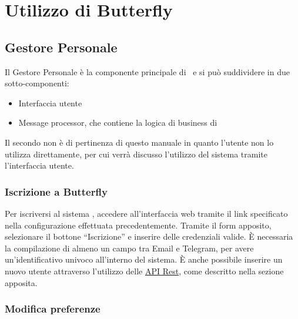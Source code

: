 \section{Utilizzo di Butterfly}\label{utilizzo}


\subsection{Gestore Personale}

Il Gestore Personale è la componente principale di \progetto\ e si può suddividere in due sotto-componenti:

\begin{itemize}
    \item Interfaccia utente
    \item Message processor, che contiene la logica di business di \progetto
\end{itemize}

Il secondo non è di pertinenza di questo manuale in quanto l'utente non lo utilizza direttamente, per cui verrà discusso l'utilizzo del sistema tramite l'interfaccia utente.


\subsubsection{Iscrizione a Butterfly}

Per iscriversi al sistema \progetto, accedere all'interfaccia web tramite il link specificato nella configurazione effettuata precedentemente.
Tramite il form apposito, selezionare il bottone ``Iscrizione'' e inserire delle credenziali valide.
È necessaria la compilazione di almeno un campo tra Email e Telegram, per avere un'identificativo univoco all'interno del sistema.
È anche possibile inserire un nuovo utente attraverso l'utilizzo delle \hyperref[APIRest]{API Rest}, come descritto nella sezione apposita.

\subsubsection{Modifica preferenze}

